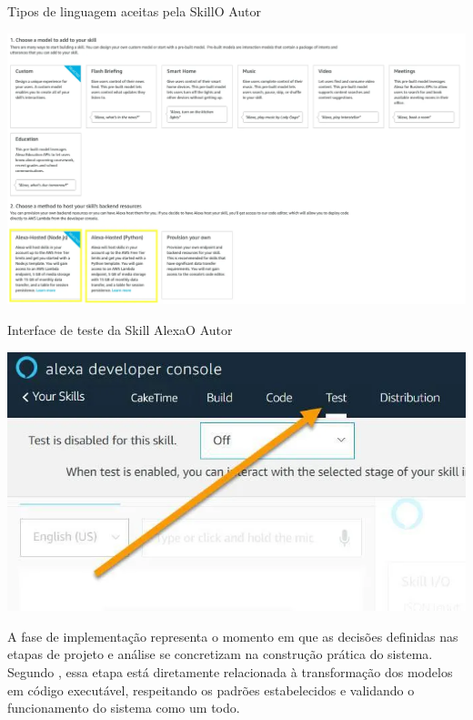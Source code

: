 \begin{figura}{Tipos de linguagem aceitas pela Skill}{O Autor}
    \begin{flushleft}
        \label{fig:linguagens-skill}
        \includegraphics[width=0.85\linewidth]{resources/floats/ilustracoes/tipos_linguagem_aceitas_skill.png}
    \end{flushleft}
\end{figura}

\begin{figura}{Interface de teste da Skill Alexa}{O Autor}
    \begin{flushleft}
        \label{fig:teste-skill}
        \includegraphics[width=0.85\linewidth]{resources/floats/ilustracoes/tela_para_testar_skill_criada.png}
    \end{flushleft}
\end{figura}

\label{sssec:implementação}


A fase de implementação representa o momento em que as decisões definidas nas etapas de projeto e análise se concretizam na construção prática do sistema. 
Segundo \textcite{sommerville2011}, essa etapa está diretamente relacionada à transformação dos modelos em código executável, respeitando os padrões estabelecidos e validando o funcionamento do sistema como um todo. 


